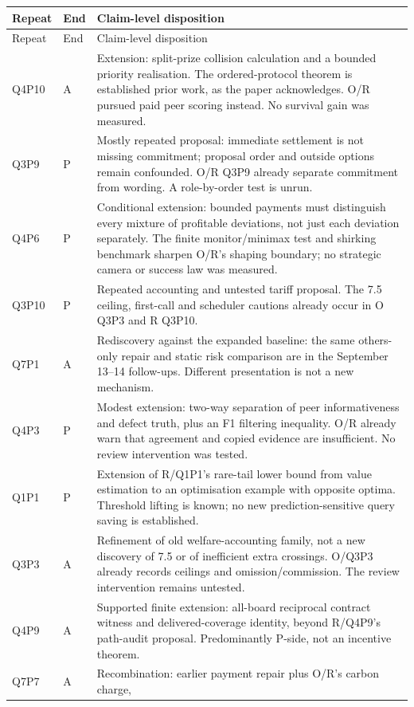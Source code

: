 \documentclass[11pt,a4paper]{article}
\begin{document}
\small
\begin{longtable}{p{17mm}p{7mm}p{112mm}}
\toprule
Repeat&End&Claim-level disposition\\\midrule
\endfirsthead
\toprule Repeat&End&Claim-level disposition\\\midrule\endhead
Q4P10&A&Extension: split-prize collision calculation and a bounded priority
realisation. The ordered-protocol theorem is established prior work, as the
paper acknowledges. O/R pursued paid peer scoring instead. No survival gain
was measured.\\
Q3P9&P&Mostly repeated proposal: immediate settlement is not missing
commitment; proposal order and outside options remain confounded. O/R Q3P9
already separate commitment from wording. A role-by-order test is unrun.\\
Q4P6&P&Conditional extension: bounded payments must distinguish every mixture
of profitable deviations, not just each deviation separately. The finite
monitor/minimax test and shirking benchmark sharpen O/R's shaping boundary;
no strategic camera or success law was measured.\\
Q3P10&P&Repeated accounting and untested tariff proposal. The 7.5 ceiling,
first-call and scheduler cautions already occur in O Q3P3 and R Q3P10.\\
Q7P1&A&Rediscovery against the expanded baseline: the same others-only
repair and static risk comparison are in the September 13--14 follow-ups.
Different presentation is not a new mechanism.\\
Q4P3&P&Modest extension: two-way separation of peer informativeness and defect
truth, plus an F1 filtering inequality. O/R already warn that agreement and
copied evidence are insufficient. No review intervention was tested.\\
Q1P1&P&Extension of R/Q1P1's rare-tail lower bound from value estimation to
an optimisation example with opposite optima. Threshold lifting is known;
no new prediction-sensitive query saving is established.\\
Q3P3&A&Refinement of old welfare-accounting family, not a new discovery of
7.5 or of inefficient extra crossings. O/Q3P3 already records ceilings and
omission/commission. The review intervention remains untested.\\
Q4P9&A&Supported finite extension: all-board reciprocal contract witness
and delivered-coverage identity, beyond R/Q4P9's path-audit proposal.
Predominantly P-side, not an incentive theorem.\\
Q7P7&A&Recombination: earlier payment repair plus O/R's carbon charge,

\end{longtable}
\end{document}
